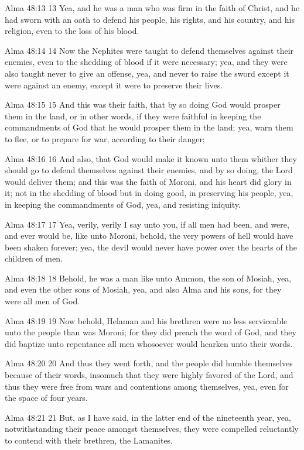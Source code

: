 Alma 48:13
 13 Yea, and he was a man who was firm in the faith of Christ,
and he had sworn with an oath to defend his people, his rights,
and his country, and his religion, even to the loss of his blood.

Alma 48:14
 14 Now the Nephites were taught to defend themselves against
their enemies, even to the shedding of blood if it were
necessary; yea, and they were also taught never to give an
offense, yea, and never to raise the sword except it were against
an enemy, except it were to preserve their lives.

Alma 48:15
 15 And this was their faith, that by so doing God would prosper
them in the land, or in other words, if they were faithful in
keeping the commandments of God that he would prosper them in the
land; yea, warn them to flee, or to prepare for war, according to
their danger;

Alma 48:16
 16 And also, that God would make it known unto them whither they
should go to defend themselves against their enemies, and by so
doing, the Lord would deliver them; and this was the faith of
Moroni, and his heart did glory in it; not in the shedding of
blood but in doing good, in preserving his people, yea, in
keeping the commandments of God, yea, and resisting iniquity.

Alma 48:17
 17 Yea, verily, verily I say unto you, if all men had been, and
were, and ever would be, like unto Moroni, behold, the very
powers of hell would have been shaken forever; yea, the devil
would never have power over the hearts of the children of men.

Alma 48:18
 18 Behold, he was a man like unto Ammon, the son of Mosiah, yea,
and even the other sons of Mosiah, yea, and also Alma and his
sons, for they were all men of God.

Alma 48:19
 19 Now behold, Helaman and his brethren were no less serviceable
unto the people than was Moroni; for they did preach the word of
God, and they did baptize unto repentance all men whosoever would
hearken unto their words.

Alma 48:20
 20 And thus they went forth, and the people did humble
themselves because of their words, insomuch that they were highly
favored of the Lord, and thus they were free from wars and
contentions among themselves, yea, even for the space of four
years.

Alma 48:21
 21 But, as I have said, in the latter end of the nineteenth
year, yea, notwithstanding their peace amongst themselves, they
were compelled reluctantly to contend with their brethren, the
Lamanites.

